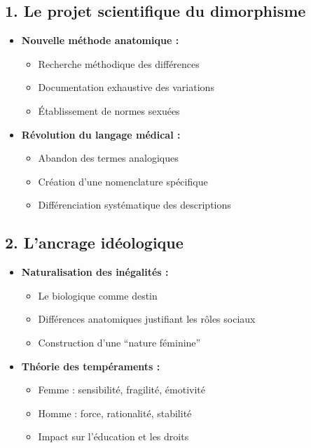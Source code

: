 \documentclass[
  letterpaper,
  DIV=11,
  numbers=noendperiod]{scrreprt}
\providecommand{\tightlist}{%
  \setlength{\itemsep}{0pt}\setlength{\parskip}{0pt}}\usepackage{longtable,booktabs,array}
\begin{document}
\subsection{1. Le projet scientifique du
dimorphisme}\label{le-projet-scientifique-du-dimorphisme}

\begin{itemize}
\tightlist
\item
  \textbf{Nouvelle méthode anatomique :}

  \begin{itemize}
  \tightlist
  \item
    Recherche méthodique des différences
  \item
    Documentation exhaustive des variations
  \item
    Établissement de normes sexuées
  \end{itemize}
\item
  \textbf{Révolution du langage médical :}

  \begin{itemize}
  \tightlist
  \item
    Abandon des termes analogiques
  \item
    Création d'une nomenclature spécifique
  \item
    Différenciation systématique des descriptions
  \end{itemize}
\end{itemize}

\subsection{2. L'ancrage idéologique}\label{lancrage-iduxe9ologique}

\begin{itemize}
\tightlist
\item
  \textbf{Naturalisation des inégalités :}

  \begin{itemize}
  \tightlist
  \item
    Le biologique comme destin
  \item
    Différences anatomiques justifiant les rôles sociaux
  \item
    Construction d'une ``nature féminine''
  \end{itemize}
\item
  \textbf{Théorie des tempéraments :}

  \begin{itemize}
  \tightlist
  \item
    Femme : sensibilité, fragilité, émotivité
  \item
    Homme : force, rationalité, stabilité
  \item
    Impact sur l'éducation et les droits
  \end{itemize}
\end{itemize}
\end{document}
